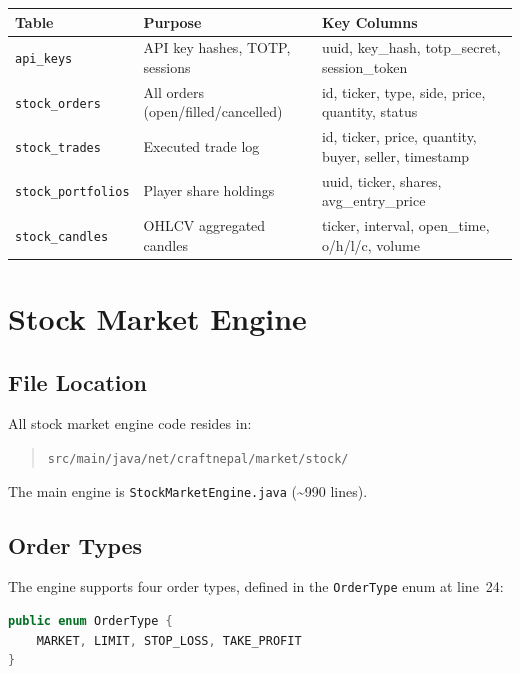 \documentclass[12pt,a4paper]{report}
\begin{document}
\begin{tabular}{>{\raggedright\arraybackslash}p{3cm}>{\raggedright\arraybackslash}p{4.5cm}>{\raggedright\arraybackslash}p{7.5cm}}
\toprule
\textbf{Table} & \textbf{Purpose} & \textbf{Key Columns} \\
\midrule
\texttt{api\_keys} & API key hashes, TOTP, sessions & uuid, key\_hash, totp\_secret, session\_token \\
\texttt{stock\_orders} & All orders (open/filled/cancelled) & id, ticker, type, side, price, quantity, status \\
\texttt{stock\_trades} & Executed trade log & id, ticker, price, quantity, buyer, seller, timestamp \\
\texttt{stock\_portfolios} & Player share holdings & uuid, ticker, shares, avg\_entry\_price \\
\texttt{stock\_candles} & OHLCV aggregated candles & ticker, interval, open\_time, o/h/l/c, volume \\
\bottomrule
\end{tabular}

\chapter{Stock Market Engine}

\section{File Location}

All stock market engine code resides in:
\begin{quote}
\texttt{src/main/java/net/craftnepal/market/stock/}
\end{quote}

The main engine is \texttt{StockMarketEngine.java} (\textasciitilde990 lines).

\section{Order Types}

The engine supports four order types, defined in the \texttt{OrderType} enum
at line~24:

\begin{lstlisting}[language=Java, caption=Order types (StockMarketEngine.java:24)]
public enum OrderType {
    MARKET, LIMIT, STOP_LOSS, TAKE_PROFIT
}
\end{lstlisting}
\end{document}
